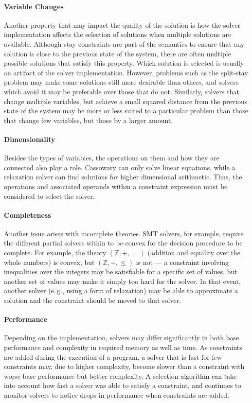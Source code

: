 \documentclass[numbers]{sigplanconf}
\newcommand{\hairspace}{\,}
\newcommand{\eg}{e.\hairspace{}g.,\xspace}
\begin{document}
\paragraph*{Variable Changes} Another property that may impact the quality of
the solution is how the solver implementation affects the selection of solutions
when multiple solutions are available. Although stay constraints are part of the
semantics to ensure that any solution is close to the previous state of the
system, there are often multiple possible solutions that satisfy this
property. Which solution is selected is usually an artifact of the solver
implementation. However, problems such as the split-stay problem may make some
solutions still more desirable than others, and solvers which avoid it may be
preferable over those that do not. Similarly, solvers that change multiple
variables, but achieve a small squared distance from the previous state of the
system may be more or less suited to a particular problem than those that change
few variables, but those by a larger amount.

\paragraph*{Dimensionality} Besides the types of variables, the
operations on them and how they are connected also play a
role. Cassowary can only solve linear equations, while a relaxation
solver can find solutions for higher dimensional arithmetic. Thus, the
operations and associated operands within a constraint expression must
be considered to select the solver.

\paragraph*{Completeness} Another issue arises with incomplete
theories. SMT solvers, for example, require the different
partial solvers within to be convex for the decision procedure to be
complete. For example, the theory $(\mathbb{Z},+,=)$ (addition and
equality over the whole numbers) is convex, but $(\mathbb{Z},+,\leq)$
is not --- a constraint involving inequalities over the integers may
be satisfiable for a specific set of values, but another set of values
may make it simply too hard for the solver. In that event, another
solver (\eg using a form of relaxation) may be able to approximate a
solution and the constraint should be moved to that solver.

\paragraph*{Performance} Depending on the implementation, solvers may
differ significantly in both base performance and complexity in
required memory as well as time. As constraints are added during the
execution of a program, a solver that is fast for few constraints may,
due to higher complexity, become slower than a constraint with worse
base performance but better complexity. A selection algorithm can take
into account how fast a solver was able to satisfy a constraint, and
continues to monitor solvers to notice drops in performance when
constraints are added.\\
\end{document}

